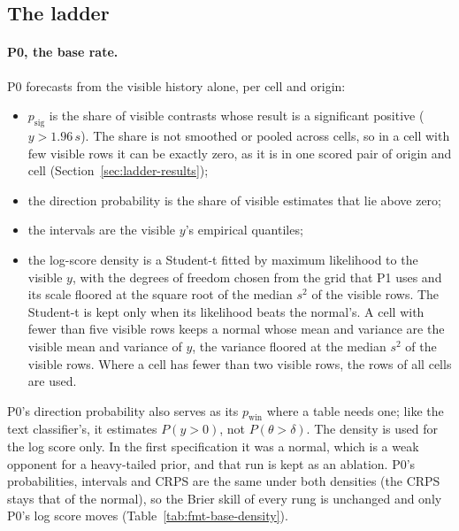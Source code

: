 \documentclass[sigconf,nonacm]{acmart}
\newcommand{\pwin}{p_{\mathrm{win}}}
\newcommand{\psig}{p_{\mathrm{sig}}}
\begin{document}
\subsection{The ladder}
\paragraph{P0, the base rate.} P0 forecasts from the visible history alone, per cell and origin:
\begin{itemize}
\item $\psig$ is the share of visible contrasts whose result is a significant positive ($y > 1.96\,s$). The share is not smoothed or pooled across cells, so in a cell with few visible rows it can be exactly zero, as it is in one scored pair of origin and cell (Section~\ref{sec:ladder-results});
\item the direction probability is the share of visible estimates that lie above zero;
\item the intervals are the visible $y$'s empirical quantiles;
\item the log-score density is a Student-t fitted by maximum likelihood to the visible $y$, with the degrees of freedom chosen from the grid that P1 uses and its scale floored at the square root of the median $s^2$ of the visible rows. The Student-t is kept only when its likelihood beats the normal's. A cell with fewer than five visible rows keeps a normal whose mean and variance are the visible mean and variance of $y$, the variance floored at the median $s^2$ of the visible rows. Where a cell has fewer than two visible rows, the rows of all cells are used.
\end{itemize}
P0's direction probability also serves as its $\pwin$ where a table needs one; like the text classifier's, it estimates $P(y > 0)$, not $P(\theta > \delta)$. The density is used for the log score only. In the first specification it was a normal, which is a weak opponent for a heavy-tailed prior, and that run is kept as an ablation. P0's probabilities, intervals and CRPS are the same under both densities (the CRPS stays that of the normal), so the Brier skill of every rung is unchanged and only P0's log score moves (Table~\ref{tab:fmt-base-density}).
\end{document}
